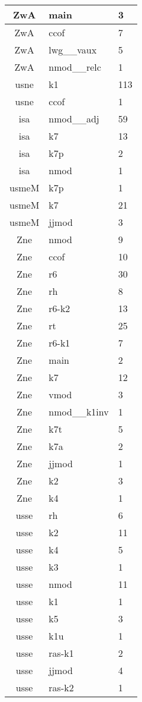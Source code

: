 \documentclass[a4 paper]{article}
\begin{document}
\begin{longtable}{cp{}p{}}
ZwA & main & 3\\ \midrule ZwA & ccof & 7\\ \midrule ZwA & lwg\_\_vaux & 5\\ \midrule ZwA & nmod\_\_relc & 1\\ \midrule 
usne & k1 & 113\\ \midrule usne & ccof & 1\\ \midrule 
isa & nmod\_\_adj & 59\\ \midrule isa & k7 & 13\\ \midrule isa & k7p & 2\\ \midrule isa & nmod & 1\\ \midrule 
usmeM & k7p & 1\\ \midrule usmeM & k7 & 21\\ \midrule usmeM & jjmod & 3\\ \midrule 
Zne & nmod & 9\\ \midrule Zne & ccof & 10\\ \midrule Zne & r6 & 30\\ \midrule Zne & rh & 8\\ \midrule Zne & r6-k2 & 13\\ \midrule Zne & rt & 25\\ \midrule Zne & r6-k1 & 7\\ \midrule Zne & main & 2\\ \midrule Zne & k7 & 12\\ \midrule Zne & vmod & 3\\ \midrule Zne & nmod\_\_k1inv & 1\\ \midrule Zne & k7t & 5\\ \midrule Zne & k7a & 2\\ \midrule Zne & jjmod & 1\\ \midrule Zne & k2 & 3\\ \midrule Zne & k4 & 1\\ \midrule 
usse & rh & 6\\ \midrule usse & k2 & 11\\ \midrule usse & k4 & 5\\ \midrule usse & k3 & 1\\ \midrule usse & nmod & 11\\ \midrule usse & k1 & 1\\ \midrule usse & k5 & 3\\ \midrule usse & k1u & 1\\ \midrule usse & ras-k1 & 2\\ \midrule usse & jjmod & 4\\ \midrule usse & ras-k2 & 1\\ \midrule 

\end{longtable}
\end{document}
